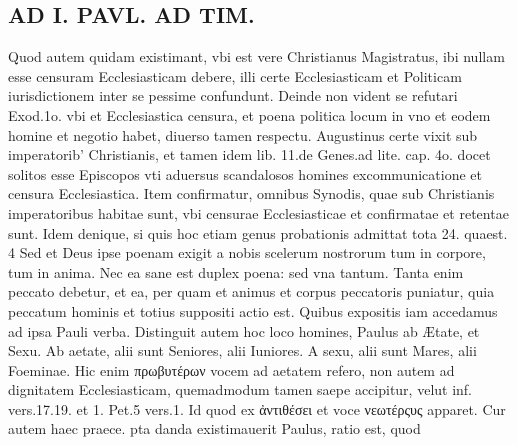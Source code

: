 \documentclass{article}
\begin{document}
\begin{pages}
\section*{AD I. PAVL. AD TIM. }
\marginpar{[ p.248 ]}\pstart Quod autem quidam existimant, vbi est vere Christianus Magistratus, ibi nullam esse censuram Ecclesiasticam debere, illi certe Ecclesiasticam et Politicam iurisdictionem inter se pessime confundunt. Deinde non vident se refutari Exod.1o. vbi et Ecclesiastica censura, et poena politica locum in vno et eodem homine et negotio habet, diuerso tamen respectu. Augustinus certe vixit sub imperatorib' Christianis, et tamen idem lib. 11.de Genes.ad lite. cap. 4o. docet solitos esse Episcopos vti aduersus scandalosos homines excommunicatione et censura Ecclesiastica. Item confirmatur, omnibus Synodis, quae sub Christianis imperatoribus habitae sunt, vbi censurae Ecclesiasticae et confirmatae et retentae sunt. Idem denique, si quis hoc etiam genus probationis admittat tota 24. quaest. 4 Sed et Deus ipse poenam exigit a nobis scelerum nostrorum tum in corpore, tum in anima. Nec ea sane est duplex poena: sed vna tantum. Tanta enim peccato debetur, et ea, per quam et animus et corpus peccatoris puniatur, quia peccatum hominis et totius suppositi actio est. Quibus expositis iam accedamus ad ipsa Pauli verba. Distinguit autem hoc loco homines, Paulus ab Ætate, et Sexu. Ab aetate, alii sunt Seniores, alii Iuniores. A sexu, alii sunt Mares, alii Foeminae. Hic enim πρωβυτέρων vocem ad aetatem refero, non autem ad dignitatem Ecclesiasticam, quemadmodum tamen saepe accipitur, velut inf. vers.17.19. et 1. Pet.5 vers.1. Id quod ex ἀντιθέσει et voce νεωτέρςυς apparet. Cur autem haec praece. pta danda existimauerit Paulus, ratio est, quod  \pend

\end{pages}
\end{document}
